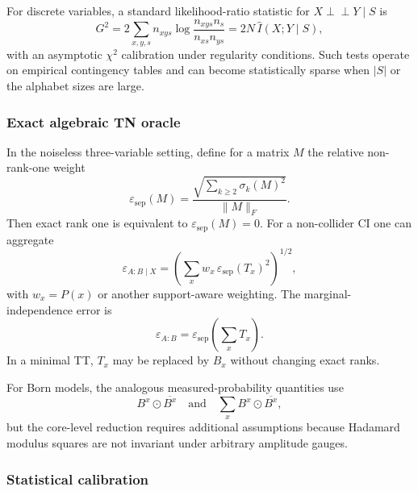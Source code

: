 \documentclass[11pt]{article}
\theoremstyle{remark}
\newcommand{\indep}{\perp\!\!\!\perp}
\newcommand{\odotc}{\mathbin{\odot}}
\begin{document}
For discrete variables, a standard likelihood-ratio statistic for $X\indep Y\mid S$ is
\begin{equation}
G^2=2\sum_{x,y,s}n_{xys}
\log\frac{n_{xys}n_s}{n_{xs}n_{ys}}
=2N\,\widehat I(X;Y\mid S),
\end{equation}
with an asymptotic $\chi^2$ calibration under regularity conditions. Such tests operate on empirical contingency tables and can become statistically sparse when $|S|$ or the alphabet sizes are large.

\subsubsection{Exact algebraic TN oracle}

In the noiseless three-variable setting, define for a matrix $M$ the relative non-rank-one weight
\begin{equation}
\varepsilon_{\mathrm{sep}}(M)
=\frac{\sqrt{\sum_{k\ge2}\sigma_k(M)^2}}{\|M\|_F}.
\label{eq:sep-error}
\end{equation}
Then exact rank one is equivalent to $\varepsilon_{\mathrm{sep}}(M)=0$. For a non-collider CI one can aggregate
\begin{equation}
\varepsilon_{A:B\mid X}
=\left(\sum_x w_x\,\varepsilon_{\mathrm{sep}}(T_x)^2\right)^{1/2},
\end{equation}
with $w_x=P(x)$ or another support-aware weighting. The marginal-independence error is
\begin{equation}
\varepsilon_{A:B}=\varepsilon_{\mathrm{sep}}\!\left(\sum_xT_x\right).
\end{equation}
In a minimal TT, $T_x$ may be replaced by $B_x$ without changing exact ranks.

For Born models, the analogous measured-probability quantities use
\begin{equation}
B^x\odotc\overline{B^x}
\quad\text{and}\quad
\sum_xB^x\odotc\overline{B^x},
\end{equation}
but the core-level reduction requires additional assumptions because Hadamard modulus squares are not invariant under arbitrary amplitude gauges.

\subsubsection{Statistical calibration}
\end{document}
